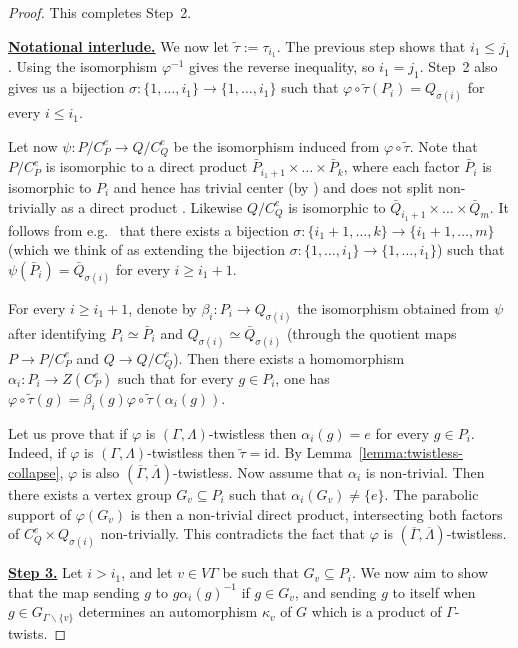 \documentclass[a4paper,english,11pt]{article}
\theoremstyle{definition}
\theoremstyle{remark}
\begin{document}
\begin{proof}
This completes Step~2.

\medskip

\underline{\textbf{Notational interlude.}} We now let  $\tilde\tau:=\tau_{i_1}$. The previous step shows that $i_1\le j_1$. Using the isomorphism $\varphi^{-1}$ gives the reverse inequality, so $i_1=j_1$. Step~2 also gives us a bijection $\sigma:\{1,\dots,i_1\}\to\{1,\dots,i_1\}$ such that $\varphi\circ \tilde\tau(P_i)=Q_{\sigma(i)}$ for every $i\le i_1$. 

Let now $\psi:P/C^e_P\rightarrow Q/C^e_Q$ be the isomorphism induced from $\varphi\circ\tilde\tau$. Note that $P/C^e_P$ is isomorphic to a direct product $\bar{P}_{i_1+1}\times\dots\times \bar{P}_k$, where each factor $\bar{P}_i$ is isomorphic to $P_i$ and hence has trivial center (by \cite[Theorem~3.34]{Gre}) and does not split non-trivially as a direct product \cite[Proposition~2.8]{Gen}. Likewise $Q/C^e_Q$ is isomorphic to $\bar Q_{i_1+1}\times\dots\times \bar Q_m$. It follows from e.g.\ \cite[Lemma~3.5]{Fio} that there exists a bijection $\sigma:\{i_1+1,\dots,k\}\to\{i_1+1,\dots,m\}$ (which we think of as extending the bijection $\sigma:\{1,\dots,i_1\}\to\{1,\dots,i_1\}$) such that $\psi(\bar P_i)=\bar Q_{\sigma(i)}$ for every $i\ge i_1+1$.

For every $i\ge {i_1}+1$, denote by $\beta_i:P_i\to Q_{\sigma(i)}$ the isomorphism obtained from $\psi$ after identifying $P_i\simeq\bar P_i$ and $Q_{\sigma(i)}\simeq \bar Q_{\sigma(i)}$ (through the quotient maps $P\to P/C^e_P$ and $Q\to Q/C^e_Q$). Then there exists a homomorphism $\alpha_i:P_i\to Z(C^e_P)$ such that for every $g\in P_i$, one has $\varphi\circ\tilde\tau(g)=\beta_i(g)\varphi\circ\tilde\tau(\alpha_i(g))$.

Let us prove that if $\varphi$ is $(\Gamma,\Lambda)$-twistless then $\alpha_i(g)=e$ for every $g\in P_i$. Indeed, if $\varphi$ is $(\Gamma,\Lambda)$-twistless then $\tilde\tau=\mathrm{id}$. By Lemma~\ref{lemma:twistless-collapse}, $\varphi$ is also $(\overline{\Gamma},\overline{\Lambda})$-twistless. Now assume that $\alpha_i$ is non-trivial. Then there exists a vertex group $G_v\subseteq P_i$ such that $\alpha_i(G_v)\neq\{e\}$. The parabolic support of $\varphi(G_v)$ is then a non-trivial direct product, intersecting both factors of $C_Q^e\times Q_{\sigma(i)}$ non-trivially. This contradicts the fact that $\varphi$ is $(\overline{\Gamma},\overline{\Lambda})$-twistless. 

\medskip

\underline{\textbf{Step 3.}} Let $i>i_1$, and let $v\in V\Gamma$ be such that $G_v\subseteq P_i$. We now aim to show that the map sending $g$ to $g\alpha_i(g)^{-1}$ if $g\in G_v$, and sending $g$ to itself when $g\in G_{\Gamma\backslash \{v\}}$ determines an automorphism $\kappa_v$ of $G$ which is a product of $\Gamma$-twists.


\end{proof}
\end{document}
